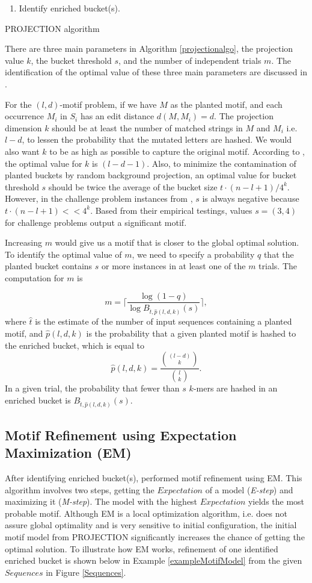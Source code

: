 \documentclass{llncs}
\begin{document}
{\begin{algorithm}
\begin{enumerate}
\item Identify enriched bucket(s).
\end{enumerate}
\caption{PROJECTION algorithm}
\end{algorithm}


There are three main parameters in Algorithm \ref{projectionalgo}, the projection value $k$, the bucket threshold $s$, and the number of independent trials $m$. The identification of the optimal value of these three main parameters are discussed in \cite{tompa}.

For the $(l,d)$-motif problem, if we have $M$ as the planted motif, and each occurrence $M_i$ in $S_i$ has an edit distance $d(M,M_i)=d$. The projection dimension $k$ should be at least the number of matched strings in $M$ and $M_i$ i.e. $l-d$, to lessen the probability that the mutated letters are hashed. We would also want $k$ to be as high as possible to capture the original motif. According to \cite{tompa}, the optimal value for $k$ is $(l-d-1)$.   Also, to minimize the contamination of planted buckets by random background projection, an optimal value for bucket threshold $s$ should be twice the average of the bucket size $t\cdot(n-l+1)/4^k$. However, in the challenge problem instances from \cite{tompa}, $s$ is always negative because $t\cdot(n-l+1) << 4^k$. Based from their empirical testings, values $s = (3,4)$ for challenge problems output a significant motif. 

Increasing $m$ would give us a motif that is closer to the global optimal solution. To identify the optimal value of $m$, we need to specify a probability $q$ that the planted bucket contains $s$ or more instances in at least one of the $m$ trials. The computation for $m$ is 

$$m= \lceil{\frac{\log{(1-q)}}{\log{B_{\hat{t},\hat{p}(l,d,k)}}(s)}}\rceil, $$
where $\hat{t}$ is the estimate of the number of input sequences containing a planted motif, and $\hat{p}(l,d,k)$ is the probability that a given planted motif is hashed to the enriched bucket, which is equal to $$\hat{p}(l,d,k)= \frac{{(l-d) \choose k}}{{l \choose k}}.$$ In a given trial, the probability that fewer than $s$ $k$-mers are hashed in an enriched bucket is $B_{\hat{t},\hat{p}(l,d,k)}(s)$.

\subsection{Motif Refinement using Expectation Maximization (EM)}
\indent After identifying enriched bucket(s), \cite{tompa} performed motif refinement using EM. This algorithm involves two steps, getting the  $Expectation$ of a model (\textit{E-step}) and maximizing it (\textit{M-step}). The model with the highest $Expectation$ yields the most probable motif. Although EM is a local optimization algorithm, i.e. does not assure global optimality and is very sensitive to initial configuration, the initial motif model from PROJECTION significantly increases the chance of getting the optimal solution. To illustrate how  EM works, refinement  of one identified enriched bucket is shown below in Example \ref{exampleMotifModel} from the given $Sequences$ in Figure \ref{Sequences}.

}
\end{document}
